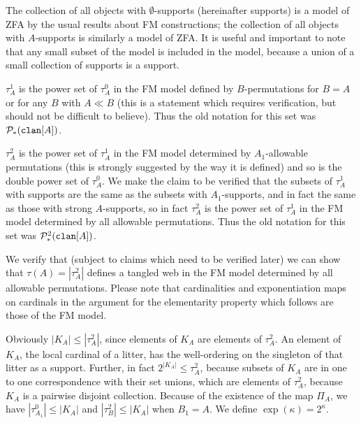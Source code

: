 \documentclass{slides}
\begin{document}
\begin{slide}

The collection of all objects with $\emptyset$-supports (hereinafter supports) is a model of ZFA by the usual results about FM constructions;  the collection of all objects
with $A$-supports is similarly a model of ZFA.  It is useful and important to note that any small subset of the model is included in the model, because a union of a small collection of supports is a support.

$\tau^1_A$ is the power set of $\tau^0_A$ in the FM model defined by $B$-permutations for $B=A$ or for any $B$ with $A \ll B$ (this is a statement which requires verification, but should not be difficult to believe).  Thus the old notation for this set was ${\cal P}_*({\tt clan}[A])$.

$\tau^2_A$ is the power set of $\tau^1_A$ in the FM model determined by $A_1$-allowable permutations (this is strongly suggested by the way it is defined) and so is the double power set of $\tau^0_A$.  We make the claim to be verified that the subsets of $\tau^1_A$ with supports are the same as the subsets with $A_1$-supports, and in fact the same as those with strong $A$-supports, so in fact $\tau^2_A$ is the power set of $\tau^1_A$ in the FM model determined by all allowable permutations.  Thus the old notation for this set was ${\cal P}^2_*({\tt clan}[A])$.

\end{slide}

\begin{slide}

We verify that (subject to claims which need to be verified later) we can show that $\tau(A) = |\tau^2_A|$ defines a tangled web in the FM model determined by all allowable permutations.  Please note that cardinalities and exponentiation maps on cardinals in the argument for the elementarity property which  follows are those of the FM model.

Obviously $|K_A| \leq |\tau^2_A|$, since elements of $K_A$ are elements of $\tau^2_A$.  An element of $K_A$, the local cardinal of a litter, has the well-ordering on the singleton of that litter
as a support.  Further, in fact $2^{|K_A|} \leq \tau^2_A$, because subsets of $K_A$ are in one to one correspondence with their set unions, which are elements of
$\tau^2_A$, because $K_A$ is a pairwise disjoint collection.  Because of the existence of the map $\Pi_A$, we have $|\tau^0_{A_1}| \leq |K_A|$ and
$|\tau^2_B| \leq |K_A|$ when $B_1=A$.  We define $\exp(\kappa) = 2^\kappa$.

\end{slide}
\end{document}
